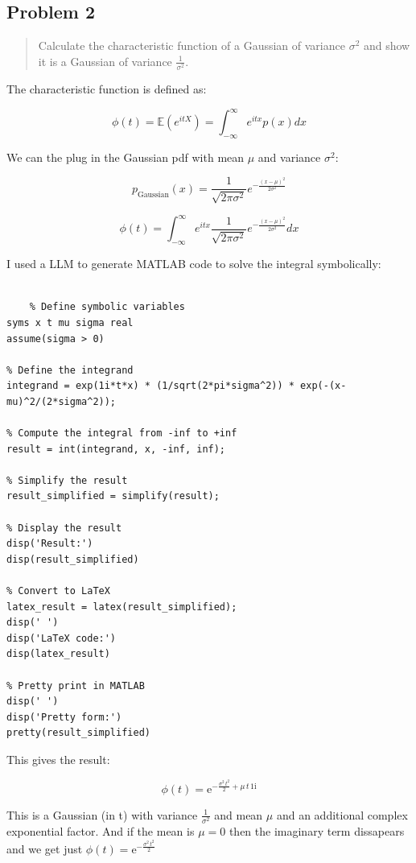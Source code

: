 \documentclass[10pt]{article}
\begin{document}
\subsection*{Problem 2}
\begin{quote}
	Calculate the characteristic function of a Gaussian of variance $\sigma^{2}$ and show it is a Gaussian of variance $\frac{1}{\sigma^{2}}$.
\end{quote}

\divider

The characteristic function is defined as:

\[ \phi(t) = \mathbb{E}(e^{itX}) = \int_{-\infty}^{\infty} e^{itx} p(x) dx \]

We can the plug in the Gaussian pdf with mean $\mu$ and variance $\sigma^2$:

\[ p_{\text{Gaussian}}(x) = \frac{1}{\sqrt{2\pi\sigma^2}} e^{-\frac{(x-\mu)^2}{2\sigma^2}} \]

\[ \phi(t) = \int_{-\infty}^{\infty} e^{itx} \frac{1}{\sqrt{2\pi\sigma^2}} e^{-\frac{(x-\mu)^2}{2\sigma^2}} dx \]

I used a LLM to generate MATLAB code to solve the integral symbolically:

\begin{verbatim}

	% Define symbolic variables
syms x t mu sigma real
assume(sigma > 0)

% Define the integrand
integrand = exp(1i*t*x) * (1/sqrt(2*pi*sigma^2)) * exp(-(x-mu)^2/(2*sigma^2));

% Compute the integral from -inf to +inf
result = int(integrand, x, -inf, inf);

% Simplify the result
result_simplified = simplify(result);

% Display the result
disp('Result:')
disp(result_simplified)

% Convert to LaTeX
latex_result = latex(result_simplified);
disp(' ')
disp('LaTeX code:')
disp(latex_result)

% Pretty print in MATLAB
disp(' ')
disp('Pretty form:')
pretty(result_simplified)
\end{verbatim}

This gives the result:


\[ \boxed{\phi(t) ={\mathrm{e}}^{-\frac{\sigma ^2\,t^2}{2}+\mu \,t\,1{}\mathrm{i}}}\]

This is a Gaussian (in t) with variance $\frac{1}{\sigma^2}$ and mean $\mu$ and an additional complex exponential factor. And if the mean is $\mu = 0$ then the imaginary term dissapears and we get just $\phi(t) = {\mathrm{e}}^{-\frac{\sigma ^2\,t^2}{2}}$
\end{document}
